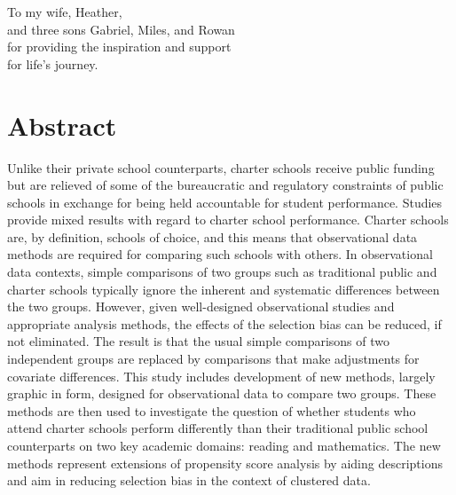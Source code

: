 \documentclass[letterpaper,12p,twoside]{article} %
\begin{document}

\setcounter{page}{3}

{}
\vspace*{2.5 in}
\begin{center}
\noindent To my wife, Heather,\\and three sons Gabriel, Miles, and Rowan\\for providing the inspiration and support\\for life's journey.
\end{center}
\vspace*{\fill}


\cleardoublepage
\section{Abstract}

Unlike their private school counterparts, charter schools receive public funding but are relieved of some of the bureaucratic and regulatory constraints of public schools in exchange for being held accountable for student performance. Studies provide mixed results with regard to charter school performance. Charter schools are, by definition, schools of choice, and this means that observational data methods are required for comparing such schools with others. In observational data contexts, simple comparisons of two groups such as traditional public and charter schools typically ignore the inherent and systematic differences between the two groups. %
However, given well-designed observational studies and appropriate analysis methods, the effects of the selection bias can be reduced, if not eliminated. The result is that the usual simple comparisons of two independent groups are replaced by comparisons that make adjustments for covariate differences. This study includes development of new methods, largely graphic in form, designed for observational data to compare two groups. These methods are then used to investigate the question of whether students who attend charter schools perform differently than their traditional public school counterparts on two key academic domains: reading and mathematics. The new methods represent extensions of propensity score analysis  by aiding descriptions and aim in reducing selection bias in the context of clustered data.
\end{document}
